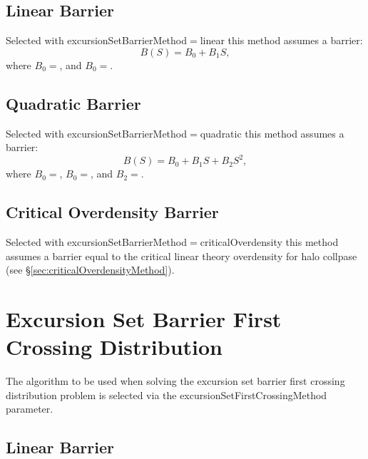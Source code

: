 \subsection{Linear Barrier}

Selected with {\normalfont \ttfamily excursionSetBarrierMethod}$=${\normalfont \ttfamily linear} this method assumes a barrier:
\begin{equation}
B(S) = B_0 + B_1 S,
\end{equation}
where $B_0=${\normalfont \ttfamily [excursionSetBarrierConstantCoefficient]}, and $B_0=${\normalfont \ttfamily [excursionSetBarrierLinearCoefficient]}.

\subsection{Quadratic Barrier}

Selected with {\normalfont \ttfamily excursionSetBarrierMethod}$=${\normalfont \ttfamily quadratic} this method assumes a barrier:
\begin{equation}
B(S) = B_0 + B_1 S + B_2 S^2,
\end{equation}
where $B_0=${\normalfont \ttfamily [excursionSetBarrierConstantCoefficient]},  $B_0=${\normalfont \ttfamily [excursionSetBarrierLinearCoefficient]}, and $B_2=${\normalfont \ttfamily [excursionSetBarrierQuadraticCoefficient]}.

\subsection{Critical Overdensity Barrier}

Selected with {\normalfont \ttfamily excursionSetBarrierMethod}$=${\normalfont \ttfamily criticalOverdensity} this method assumes a barrier equal to the critical linear theory overdensity for halo collpase (see \S\ref{sec:criticalOverdensityMethod}).

\section{Excursion Set Barrier First Crossing Distribution}

The algorithm to be used when solving the excursion set barrier first crossing distribution problem is selected via the {\normalfont \ttfamily excursionSetFirstCrossingMethod} parameter.

\subsection{Linear Barrier}

